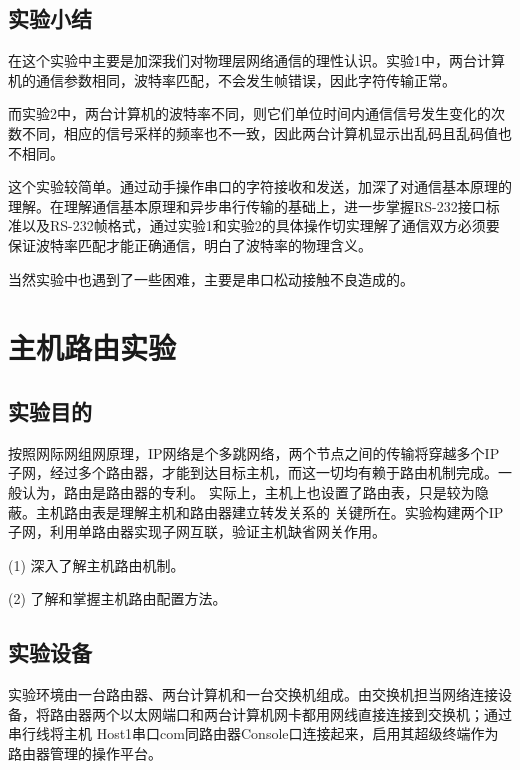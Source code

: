 \documentclass[lang=cn,11pt,a4paper,cite=authoryear]{elegantpaper}
\begin{document}
\subsection{实验小结}

在这个实验中主要是加深我们对物理层网络通信的理性认识。实验1中，两台计算机的通信参数相同，波特率匹配，不会发生帧错误，因此字符传输正常。

而实验2中，两台计算机的波特率不同，则它们单位时间内通信信号发生变化的次数不同，相应的信号采样的频率也不一致，因此两台计算机显示出乱码且乱码值也不相同。

这个实验较简单。通过动手操作串口的字符接收和发送，加深了对通信基本原理的理解。在理解通信基本原理和异步串行传输的基础上，进一步掌握RS-232接口标准以及RS-232帧格式，通过实验1和实验2的具体操作切实理解了通信双方必须要保证波特率匹配才能正确通信，明白了波特率的物理含义。

当然实验中也遇到了一些困难，主要是串口松动接触不良造成的。
\section{主机路由实验}
\subsection{实验目的}

按照网际网组网原理，IP网络是个多跳网络，两个节点之间的传输将穿越多个IP子网，经过多个路由器，才能到达目标主机，而这一切均有赖于路由机制完成。一般认为，路由是路由器的专利。 实际上，主机上也设置了路由表，只是较为隐蔽。主机路由表是理解主机和路由器建立转发关系的 关键所在。实验构建两个IP子网，利用单路由器实现子网互联，验证主机缺省网关作用。

(1)	深入了解主机路由机制。

(2)	了解和掌握主机路由配置方法。

\subsection{实验设备}

实验环境由一台路由器、两台计算机和一台交换机组成。由交换机担当网络连接设备，将路由器两个以太网端口和两台计算机网卡都用网线直接连接到交换机；通过串行线将主机 Host1串口com同路由器Console口连接起来，启用其超级终端作为路由器管理的操作平台。
\end{document}
